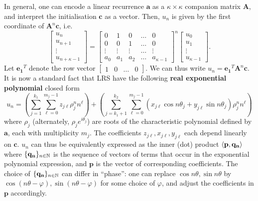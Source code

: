 In general, one can encode a linear recurrence $\mathbf{a}$ as a $\kappa \times \kappa$ companion matrix $\mathbf{A}$, and interpret the initialisation $\mathbf{c}$ as a vector. Then, $u_n$ is given by the first coordinate of $\mathbf{A}^n\mathbf{c}$, i.e.
\begin{equation}
\label{eq:companion}
\begin{bmatrix}
u_n \\
u_{n+1} \\
\vdots \\
u_{n+\kappa-1}
\end{bmatrix} 
= 
\begin{bmatrix}
0 & 1 & 0 & \dots & 0 \\
0 & 0 & 1 & \dots & 0 \\
\vdots & \vdots & \vdots & \dots & \vdots \\
a_0 & a_1 & a_2 & \dots & a_{\kappa-1}
\end{bmatrix}^n
\begin{bmatrix}
u_0 \\
u_{1} \\
\vdots \\
u_{\kappa-1}
\end{bmatrix}.
\end{equation}
Let $\mathbf{e_1}^T$ denote the row vector $\begin{bmatrix}1 & 0 & \dots & 0\end{bmatrix}$. We can thus write $u_n = \mathbf{e_1}^T\mathbf{A}^n\mathbf{c}$. It is now a standard fact that LRS have the following \textbf{real exponential polynomial} closed form 
\begin{equation}
\label{eq:realexppoly}
u_n = \left(\sum_{j=1}^{k_1}\sum_{\ell = 0}^{m_j-1} z_{j\ell}\rho_j^n n^\ell\right) + \left(\sum_{j=k_1 + 1}^{k_2} \sum_{\ell = 0}^{m_j-1} (x_{j\ell} \cos n\theta_j + y_{j\ell}\sin n\theta_j)\rho_j^n n^\ell\right)
\end{equation}
where $\rho_j$ (alternately, $\rho_j e^{i\theta_j}$) are roots of the characteristic polynomial defined by $\mathbf{a}$, each with multiplicity $m_j$. The coefficients $z_{j\ell}, x_{j\ell}, y_{j\ell}$ each depend linearly on $\mathbf{c}$. $u_n$ can thus be equivalently expressed as the inner (dot) product $\langle\mathbf{p}, \mathbf{q_n}\rangle$ where $\{\mathbf{q_n}\}_{n\in \mathbb{N}}$ is the sequence of vectors of terms that occur in the exponential polynomial expression, and $\mathbf{p}$ is the vector of corresponding coefficients. The choice of $\{\mathbf{q_n}\}_{n\in \mathbb{N}}$ can differ in ``phase'': one can replace $\cos n\theta, \sin n\theta$ by $\cos (n\theta-\varphi), \sin(n\theta-\varphi)$ for some choice of $\varphi$, and adjust the coefficients in $\mathbf{p}$ accordingly.

